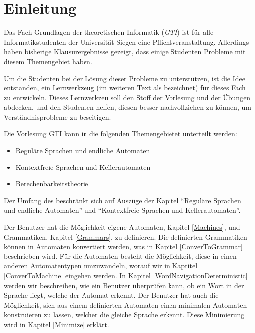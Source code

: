 



\chapter{Einleitung}\label{Introduction}

Das Fach Grundlagen der theoretischen Informatik (\textit{GTI}) ist für alle
Informatikstudenten der Universität Siegen eine Pflichtveranstaltung. Allerdings
haben bisherige Klausurergebnisse gezeigt, dass einige Studenten Probleme mit
diesem Themengebiet haben.\vspace{10pt}

Um die Studenten bei der Lösung dieser Probleme zu unterstützen, ist die Idee
entstanden, ein Lernwerkzeug (im weiteren Text als \textit{\gtitool} bezeichnet)
für dieses Fach zu entwickeln. Dieses Lernwerkzeu soll den Stoff der Vorlesung
und der Übungen abdecken, und den Studenten helfen, diesen besser
nachvollziehen zu können, um Verständnisprobleme zu beseitigen.\vspace{10pt}

\noindent
Die Vorlesung GTI kann in die folgenden Themengebietet unterteilt
werden:\vspace{10pt} 

\begin{itemize}
  \item Reguläre Sprachen und endliche Automaten
  \item Kontextfreie Sprachen und Kellerautomaten
  \item Berechenbarkeitstheorie
\end{itemize}\vspace{10pt}

\noindent
Der Umfang des \gtitools beschränkt sich auf Auszüge der Kapitel
"`Reguläre Sprachen und endliche Automaten"' und "`Kontextfreie Sprachen und
Kellerautomaten"'.\vspace{10pt}

Der Benutzer hat die Möglichkeit eigene Automaten, Kapitel \ref{Machines}, und
Grammatiken, Kapitel \ref{Grammars},  zu definieren. Die definierten Grammatiken
können in Automaten konvertiert werden, was in Kapitel \ref{ConverToGrammar} beschrieben wird. Für die Automaten besteht
die Möglichkeit, diese in einen anderen Automatentypen umzuwandeln, worauf wir
in Kaptitel \ref{ConverToMachine} eingehen werden. In Kapitel
\ref{WordNavigationDeterministic} werden wir beschreiben, wie ein
Benutzer überprüfen kann, ob ein Wort in der Sprache liegt, welche
der Automat erkennt. Der Benutzer hat auch die Möglichkeit, sich
aus einem definierten Automaten einen minimalen Automaten
konstruieren zu lassen, welcher die gleiche Sprache erkennt. Diese
Minimierung wird in Kapitel \ref{Minimize} erklärt.\vspace{10pt}


